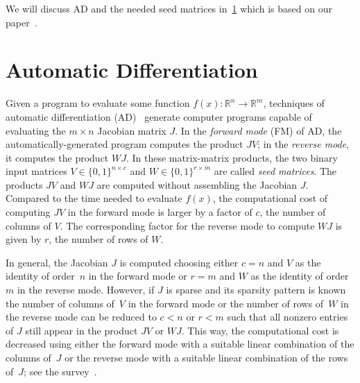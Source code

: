\documentclass[12pt, oneside]{book}
\newcommand{\setR}{\ensuremath{\mathbb{R}}}
\newcommand{\col}{\ensuremath{c}}
\newcommand{\row}{\ensuremath{r}}
\begin{document}
We will discuss AD and the needed seed matrices in~\ref{s.seedmatrix} which is based on
our paper~\cite{2014:09}.
\section{Automatic Differentiation}
\label{s.seedmatrix}
Given a program to evaluate some function $f(x) : \setR^n \rightarrow \setR^m$,
techniques of automatic differentiation (AD)~\cite{Griewank2008EDP,Rall1981ADT} generate
computer programs capable of evaluating the $m \times n$ Jacobian matrix $J$. In the
\emph{forward mode} (FM) of AD, the automatically-generated program computes the product
$JV$; in the \emph{reverse mode}, it computes the product $WJ$. In these matrix-matrix
products, the two binary input matrices $V \in \{0,1\}^{n\times \col}$ and $W\in
\{0,1\}^{\row\times m}$ are called \emph{seed matrices}. The products $JV$ and $WJ$ are
computed without assembling the Jacobian $J$. Compared to the time needed to evaluate
$f(x)$, the computational cost of computing $JV$ in the forward mode is larger by a
factor of \col, the number of columns of $V$. The corresponding factor for the reverse
mode to compute $WJ$ is given by \row, the number of rows of $W$.

In general, the Jacobian $J$ is computed choosing either $c=n$ and $V$ as the identity of
order~$n$ in the forward mode or $r = m$ and $W$ as the identity of order $m$ in the
reverse mode. However, if $J$ is sparse and its sparsity pattern is known the number of
columns of~$V$ in the forward mode or the number of rows of~$W$ in the reverse mode can
be reduced to $\col < n$ or $\row < m$ such that all nonzero entries of $J$ still appear
in the product $JV$ or $WJ$. This way, the computational cost is decreased using either
the forward mode with a suitable linear combination of the columns of~$J$ or the reverse
mode with a suitable linear combination of the rows of~$J$; see the
survey~\cite{Gebremedhin05whatcolor}.
\end{document}
